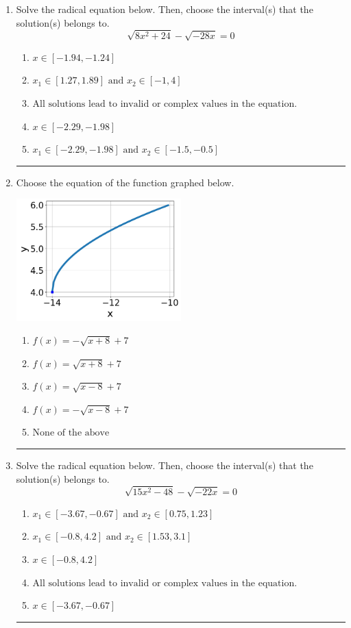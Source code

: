 \documentclass[14pt]{extbook}
\newcommand{\litem}[1]{\item#1\hspace*{-1cm}\rule{\textwidth}{0.4pt}}
\begin{document}
\begin{enumerate}
\litem{
Solve the radical equation below. Then, choose the interval(s) that the solution(s) belongs to.\[ \sqrt{8 x^2 + 24} - \sqrt{-28 x} = 0 \]\begin{enumerate}[label=\Alph*.]
\item \( x \in [-1.94,-1.24] \)
\item \( x_1 \in [1.27, 1.89] \text{ and } x_2 \in [-1,4] \)
\item \( \text{All solutions lead to invalid or complex values in the equation.} \)
\item \( x \in [-2.29,-1.98] \)
\item \( x_1 \in [-2.29, -1.98] \text{ and } x_2 \in [-1.5,-0.5] \)

\end{enumerate} }
\litem{
Choose the equation of the function graphed below.
\begin{center}
    \includegraphics[width=0.5\textwidth]{../Figures/radicalGraphToEquationC.png}
\end{center}
\begin{enumerate}[label=\Alph*.]
\item \( f(x) = - \sqrt{x + 8} + 7 \)
\item \( f(x) = \sqrt{x + 8} + 7 \)
\item \( f(x) = \sqrt{x - 8} + 7 \)
\item \( f(x) = - \sqrt{x - 8} + 7 \)
\item \( \text{None of the above} \)

\end{enumerate} }
\litem{
Solve the radical equation below. Then, choose the interval(s) that the solution(s) belongs to.\[ \sqrt{15 x^2 - 48} - \sqrt{-22 x} = 0 \]\begin{enumerate}[label=\Alph*.]
\item \( x_1 \in [-3.67, -0.67] \text{ and } x_2 \in [0.75,1.23] \)
\item \( x_1 \in [-0.8, 4.2] \text{ and } x_2 \in [1.53,3.1] \)
\item \( x \in [-0.8,4.2] \)
\item \( \text{All solutions lead to invalid or complex values in the equation.} \)
\item \( x \in [-3.67,-0.67] \)


\end{enumerate}}
\end{enumerate}
\end{document}
